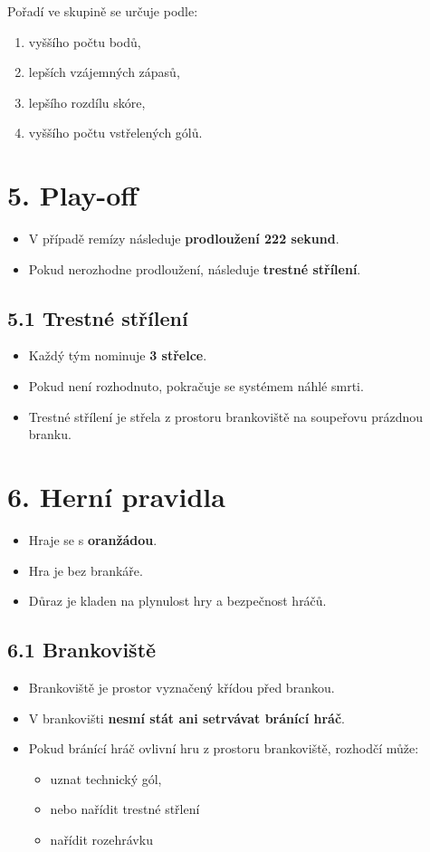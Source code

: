 \documentclass[a4paper,12pt]{article}
\begin{document}
Pořadí ve skupině se určuje podle:
\begin{enumerate}
    \item vyššího počtu bodů,
    \item lepších vzájemných zápasů,
    \item lepšího rozdílu skóre,
    \item vyššího počtu vstřelených gólů.
\end{enumerate}

\section*{5. Play-off}
\begin{itemize}
    \item V případě remízy následuje \textbf{prodloužení 222 sekund}.
    \item Pokud nerozhodne prodloužení, následuje \textbf{trestné střílení}.
\end{itemize}

\subsection*{5.1 Trestné střílení}
\begin{itemize}
    \item Každý tým nominuje \textbf{3 střelce}.
    \item Pokud není rozhodnuto, pokračuje se systémem náhlé smrti.
    \item Trestné střílení je střela z prostoru brankoviště na soupeřovu prázdnou branku. 
\end{itemize}

\section*{6. Herní pravidla}
\begin{itemize}
    \item Hraje se s \textbf{oranžádou}.
    \item Hra je bez brankáře.
    \item Důraz je kladen na plynulost hry a bezpečnost hráčů.
\end{itemize}

\subsection*{6.1 Brankoviště}
\begin{itemize}
    \item Brankoviště je prostor vyznačený křídou před brankou.
    \item V brankovišti \textbf{nesmí stát ani setrvávat bránící hráč}.
    \item Pokud bránící hráč ovlivní hru z prostoru brankoviště, rozhodčí může:
    \begin{itemize}
        \item uznat technický gól,
        \item nebo nařídit trestné střlení
        \item nařídit rozehrávku
    \end{itemize}
\end{itemize}
\end{document}
